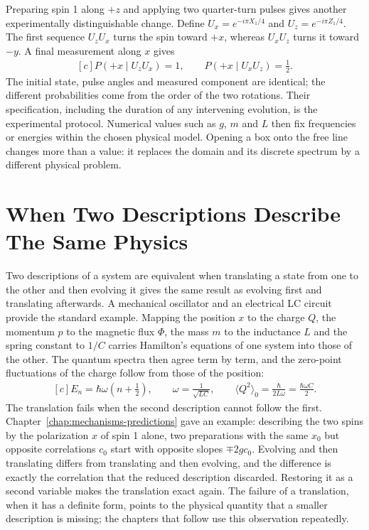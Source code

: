 \documentclass[11pt,oneside]{book}
\newenvironment{centeredalign}{\[\begin{gathered}[c]}{\end{gathered}\]}
\begin{document}
Preparing spin 1 along \(+z\) and applying two quarter-turn pulses
gives another experimentally distinguishable change. Define
\(U_x=e^{-i\pi X_1/4}\) and \(U_z=e^{-i\pi Z_1/4}\). The first
sequence \(U_zU_x\) turns the spin toward \(+x\), whereas
\(U_xU_z\) turns it toward \(-y\). A final measurement along \(x\)
gives
\begin{centeredalign}
P(+x\mid U_zU_x)=1,\qquad P(+x\mid U_xU_z)=\tfrac12.
\end{centeredalign}
The initial state, pulse angles and measured component are identical;
the different probabilities come from the order of the two rotations.
Their specification, including the duration of any intervening
evolution, is the experimental protocol. Numerical values such as
\(g\), \(m\) and \(L\) then fix frequencies or energies within the
chosen physical model. Opening a box onto the free line changes more
than a value: it replaces the domain and its discrete spectrum by a
different physical problem.

\section{When Two Descriptions Describe The Same Physics}
Two descriptions of a system are equivalent when translating a state from one to the other and then evolving it gives
the same result as evolving first and translating afterwards. A mechanical oscillator and an electrical LC circuit
provide the standard example. Mapping the position \(x\) to the charge \(Q\), the momentum \(p\) to the magnetic flux
\(\Phi\), the mass \(m\) to the inductance \(L\) and the spring constant to \(1/C\) carries Hamilton's equations of one
system into those of the other. The quantum spectra then agree term by term, and the zero-point fluctuations of the
charge follow from those of the position:
\begin{centeredalign}
E_n=\hbar\omega\left(n+\tfrac12\right),\qquad \omega=\frac{1}{\sqrt{LC}},\qquad
\langle Q^2\rangle_0=\frac{\hbar}{2L\omega}=\frac{\hbar\omega C}{2}.
\end{centeredalign}
The translation fails when the second description cannot follow the first. Chapter~\ref{chap:mechanisms-predictions}
gave an example: describing the two spins by the polarization \(x\) of spin 1 alone, two preparations with the same
\(x_0\) but opposite correlations \(c_0\) start with opposite slopes \(\mp2gc_0\). Evolving and then translating
differs from translating and then evolving, and the difference is exactly the correlation that the reduced
description discarded. Restoring it as a second variable makes the translation exact again. The failure of a
translation, when it has a definite form, points to the physical quantity that a smaller description is missing; the
chapters that follow use this observation repeatedly.
\end{document}
